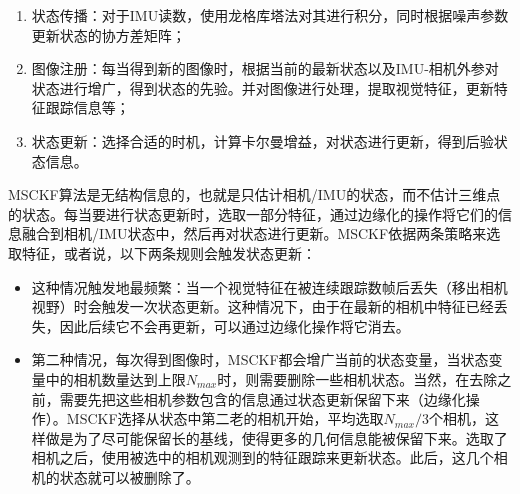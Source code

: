 \begin{enumerate}
    \item 状态传播：对于IMU读数，使用龙格库塔法对其进行积分，同时根据噪声参数更新状态的协方差矩阵；
    \item 图像注册：每当得到新的图像时，根据当前的最新状态以及IMU-相机外参对状态进行增广，得到状态的先验。并对图像进行处理，提取视觉特征，更新特征跟踪信息等；
    \item 状态更新：选择合适的时机，计算卡尔曼增益，对状态进行更新，得到后验状态信息。
\end{enumerate}

MSCKF算法是无结构信息的，也就是只估计相机/IMU的状态，而不估计三维点的状态。每当要进行状态更新时，选取一部分特征，通过边缘化的操作将它们的信息融合到相机/IMU状态中，然后再对状态进行更新。MSCKF依据两条策略来选取特征，或者说，以下两条规则会触发状态更新：

\begin{itemize}
    \item 这种情况触发地最频繁：当一个视觉特征在被连续跟踪数帧后丢失（移出相机视野）时会触发一次状态更新。这种情况下，由于在最新的相机中特征已经丢失，因此后续它不会再更新，可以通过边缘化操作将它消去。
    \item 第二种情况，每次得到图像时，MSCKF都会增广当前的状态变量，当状态变量中的相机数量达到上限$N_{max}$时，则需要删除一些相机状态。当然，在去除之前，需要先把这些相机参数包含的信息通过状态更新保留下来（边缘化操作）。MSCKF选择从状态中第二老的相机开始，平均选取$N_{max}/3$个相机，这样做是为了尽可能保留长的基线，使得更多的几何信息能被保留下来。选取了相机之后，使用被选中的相机观测到的特征跟踪来更新状态。此后，这几个相机的状态就可以被删除了。
\end{itemize}
